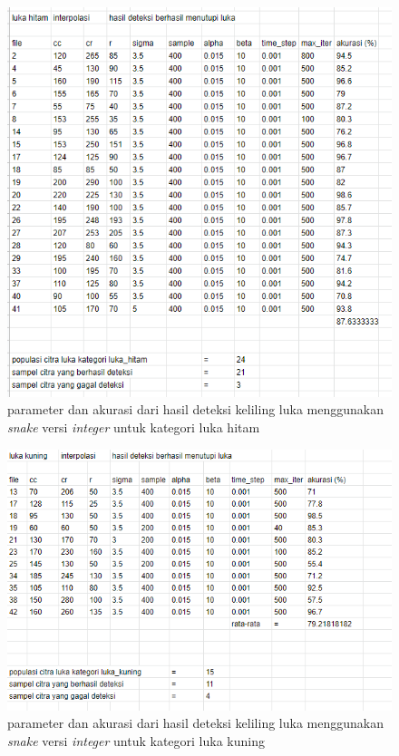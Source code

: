\begin{figure}[H]
	\centering
	\includegraphics[width=1\textwidth]{gambar/result_hitam_good1}
	\caption{parameter dan akurasi dari hasil deteksi keliling luka menggunakan \emph{snake} versi \emph{integer} untuk kategori luka hitam}
	\label{Gambar:result_hitam_good1}
\end{figure}

\begin{figure}[H]
	\centering
	\includegraphics[width=1\textwidth]{gambar/result_kuning_good1}
	\caption{parameter dan akurasi dari hasil deteksi keliling luka menggunakan \emph{snake} versi \emph{integer} untuk kategori luka kuning}
	\label{Gambar:result_kuning_good1}
\end{figure}

